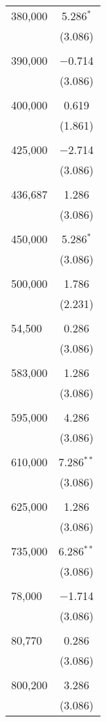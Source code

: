 \documentclass[12pt,english]{article}
\begin{document}
\begin{table}[!htbp]
\begin{tabular}{@{\extracolsep{5pt}}lc}
 380,000 & 5.286$^{*}$ \\ 
  & (3.086) \\ 
  & \\ 
 390,000 & $-$0.714 \\ 
  & (3.086) \\ 
  & \\ 
 400,000 & 0.619 \\ 
  & (1.861) \\ 
  & \\ 
 425,000 & $-$2.714 \\ 
  & (3.086) \\ 
  & \\ 
 436,687 & 1.286 \\ 
  & (3.086) \\ 
  & \\ 
 450,000 & 5.286$^{*}$ \\ 
  & (3.086) \\ 
  & \\ 
 500,000 & 1.786 \\ 
  & (2.231) \\ 
  & \\ 
 54,500 & 0.286 \\ 
  & (3.086) \\ 
  & \\ 
 583,000 & 1.286 \\ 
  & (3.086) \\ 
  & \\ 
 595,000 & 4.286 \\ 
  & (3.086) \\ 
  & \\ 
 610,000 & 7.286$^{**}$ \\ 
  & (3.086) \\ 
  & \\ 
 625,000 & 1.286 \\ 
  & (3.086) \\ 
  & \\ 
 735,000 & 6.286$^{**}$ \\ 
  & (3.086) \\ 
  & \\ 
 78,000 & $-$1.714 \\ 
  & (3.086) \\ 
  & \\ 
 80,770 & 0.286 \\ 
  & (3.086) \\ 
  & \\ 
 800,200 & 3.286 \\ 
  & (3.086) \\ 

\end{tabular}
\end{table}
\end{document}
